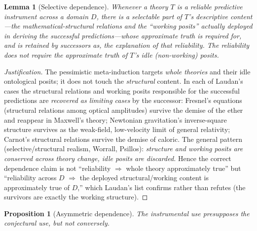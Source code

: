 \documentclass{amsart}
\theoremstyle{definition}
\theoremstyle{plain}
\newtheorem{lemma}{Lemma}
\newtheorem{proposition}{Proposition}
\begin{document}
\begin{lemma}[Selective dependence]\label{lem:selective}
Whenever a theory $T$ is a reliable predictive instrument across a domain
$D$, there is a \emph{selectable} part of $T$'s descriptive content---the
mathematical-structural relations and the ``working posits'' actually deployed
in deriving the successful predictions---whose \emph{approximate truth} is
required for, and is retained by successors as, the explanation of that
reliability. The reliability does not require the approximate truth of $T$'s
\emph{idle} (non-working) posits.
\end{lemma}

\begin{proof}[Justification]
The pessimistic meta-induction targets \emph{whole theories} and their idle
ontological posits; it does not touch the \emph{structural} content. In each of
Laudan's cases the structural relations and working posits responsible for the
successful predictions are \emph{recovered as limiting cases} by the successor:
Fresnel's equations (structural relations among optical amplitudes) survive the
demise of the ether and reappear in Maxwell's theory; Newtonian gravitation's
inverse-square structure survives as the weak-field, low-velocity limit of
general relativity; Carnot's structural relations survive the demise of
caloric. The general pattern (selective/structural realism, Worrall, Psillos):
\emph{structure and working posits are conserved across theory change, idle
posits are discarded.} Hence the correct dependence claim is not ``reliability
$\Rightarrow$ whole theory approximately true'' but ``reliability across $D$
$\Rightarrow$ the deployed structural/working content is approximately true of
$D$,'' which Laudan's list confirms rather than refutes (the survivors are
exactly the working structure).
\end{proof}

\begin{proposition}[Asymmetric dependence]\label{prop:depend}
The instrumental use presupposes the conjectural use, but not conversely.
\end{proposition}
\end{document}
